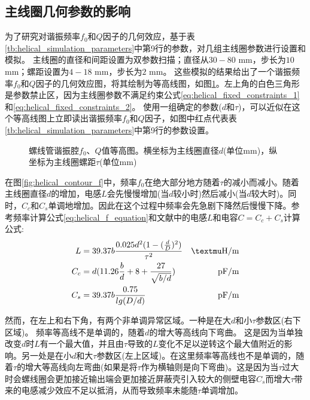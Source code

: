 \subsection[主线圈几何参数的影响]{主线圈几何参数的影响}

为了研究对谐振频率$f_0$和$Q$因子的几何效应，基于表\ref{tb:helical_simulation_parameters}中第9行的参数，对几组主线圈参数进行设置和模拟。
主线圈的直径和间距设置为双参数扫描；直径从$30-80$ mm，步长为$10$ mm；螺距设置为$4-18$ mm，步长为$2$ mm。
这些模拟的结果给出了一个谐振频率$f_0$和$Q$因子的几何效应图，将其绘制为等高线图，如图\ref{fig:helical_contour}。左上角的白色三角形是参数禁止区，因为主线圈参数不满足约束公式\eqref{eq:helical_fixed_constraints_1}和\eqref{eq:helical_fixed_constraints_2}。
使用一组确定的参数($d$和$\tau$)，可以近似在这个等高线图上立即读出谐振频率$f_0$和$Q$因子，如图中红点代表表\ref{tb:helical_simulation_parameters}中第9行的参数设置。

\begin{figure}
    \centering
    \caption[螺线管谐振腔$f_0$、$Q$值等高图]{螺线管谐振腔$f_0$、$Q$值等高图。横坐标为主线圈直径$d$(单位mm)，纵坐标为主线圈螺距$\tau$(单位mm)\label{fig:helical_contour}}
\end{figure}

在图\ref{fig:helical_contour_f}中，频率$f_0$在绝大部分地方随着$\tau$的减小而减小。随着主线圈直径$d$的增加，电感$L$会先慢慢增加(当$d$较小时)然后减小(当$d$较大时)。同时，$C_c$和$C_s$单调地增加。因此在这个过程中频率会先急剧下降然后慢慢下降。参考频率计算公式\eqref{eq:helical_f_equation}和文献\cite[]{Siverns_Simkins_Weidt_Hensinger_2012,Macalpine_Schildknecht_1959}中的电感$L$和电容$C = C_c +C_s$计算公式:
\begin{align}
    L&=39.37b\frac{0.025d^2(1-(\frac{d}{D})^2)}{\tau^2} &\mu \textnormal{H/m} \label{eq:helical_L} \\
	C_c&=d(11.26\frac{b}{d}+8+\frac{27}{\sqrt{b/d}})  &\textnormal{pF/m} \label{eq:helical_C_c}\\
	C_s&=39.37b\frac{0.75}{lg(D/d)} &\textnormal{pF/m} \label{eq:helical_C_s}
\end{align}

然而，在左上和右下角，有两个非单调异常区域。一种是在大$d$和小$\tau$参数区(右下区域)。
频率等高线不是单调的，随着$d$的增大等高线向下弯曲。
这是因为当单独改变$d$时$L$有一个最大值，并且由$\tau$导致的$L$变化不足以逆转这个最大值附近的影响。另一处是在小$d$和大$\tau$参数区(左上区域)。在这里频率等高线也不是单调的，随着$\tau$的增大等高线向左弯曲(如果是将$\tau$作为横轴则是向下弯曲)。这是因为当$\tau$过大时会螺线圈会更加接近输出端会更加接近屏蔽壳引入较大的侧壁电容$C_s$而增大$\tau$带来的电感减少效应不足以抵消，从而导致频率未能随$\tau$单调增加。

